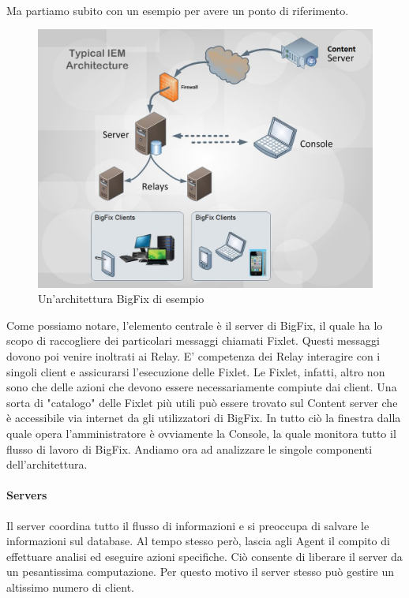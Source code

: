 \paragraph{}
Ma partiamo subito con un esempio per avere un ponto di riferimento.
\begin{figure}[h!]
	\centering
	\includegraphics[width=\textwidth,keepaspectratio=true]{capitoli/imgs/IEMArchitecture.png}
	\caption{Un'architettura BigFix di esempio}
\end{figure}
Come possiamo notare, l'elemento centrale è il server di BigFix, il quale ha lo scopo di raccogliere dei particolari messaggi chiamati Fixlet. Questi messaggi dovono poi venire inoltrati ai Relay. E' competenza dei Relay interagire con i singoli client e assicurarsi l'esecuzione delle Fixlet. Le Fixlet, infatti, altro non sono che delle azioni che devono essere necessariamente compiute dai client. Una sorta di "catalogo" delle Fixlet più utili può essere trovato sul Content server che è accessibile via internet da gli utilizzatori di BigFix. In tutto ciò la finestra dalla quale opera l'amministratore è ovviamente la Console, la quale monitora tutto il flusso di lavoro di BigFix. Andiamo ora ad analizzare le singole componenti dell'architettura.
\paragraph{Servers}
Il server coordina tutto il flusso di informazioni e si preoccupa di salvare le informazioni sul database. Al tempo stesso però, lascia agli Agent il compito di effettuare analisi ed eseguire azioni specifiche. Ciò consente di liberare il server da un pesantissima computazione. Per questo motivo il server stesso può gestire un altissimo numero di client.
